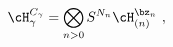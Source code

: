 \begin{equation}
 \cH_{\gamma}^{C_{\gamma}} = \bigotimes_{n>0} S^{N_n} \cH_{(n)}^{\bz_n} ~, 
\end{equation}

